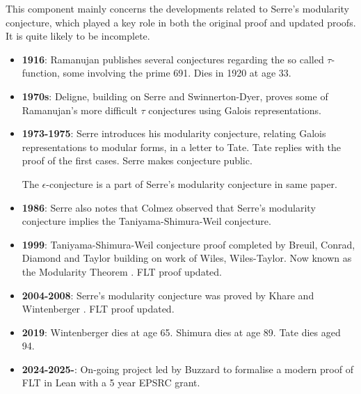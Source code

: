 \documentclass{article}
\theoremstyle{definition}
\theoremstyle{definition}
\theoremstyle{definition}
\begin{document}
This component mainly concerns the developments related to Serre's modularity conjecture, which played a key role in both the original proof and updated proofs. It is quite likely to be incomplete.
\begin{itemize}

\item \textbf{1916}: Ramanujan publishes several conjectures regarding the so called $\tau$-function, some involving the prime 691. Dies in 1920 at age 33. %

\item \textbf{1970s}: Deligne, building on Serre and Swinnerton-Dyer, proves some of Ramanujan’s more difficult $\tau$ conjectures using Galois representations.

\item \textbf{1973-1975}: Serre introduces his modularity conjecture, relating Galois representations to modular forms, in a letter to Tate. Tate replies with the proof of the first cases. Serre makes conjecture public.

 The $\epsilon$-conjecture is a part of Serre's modularity conjecture in same paper.

\item \textbf{1986}: Serre also notes that Colmez observed that Serre's modularity conjecture implies the Taniyama-Shimura-Weil conjecture.

   \item \textbf{1999}: Taniyama-Shimura-Weil conjecture proof completed by Breuil, Conrad, Diamond and Taylor building on work of Wiles, Wiles-Taylor. Now known as the Modularity Theorem \cite{BCDT}. FLT proof updated.

\item \textbf{2004-2008}: Serre's modularity conjecture was proved by Khare and Wintenberger \cite{SMC}. FLT proof updated.

\item \textbf{2019}: Wintenberger dies at age 65. Shimura dies at age 89. Tate dies aged 94.



\item \textbf{2024-2025-}: On-going project led by Buzzard to formalise a modern proof of FLT in Lean with a 5 year EPSRC grant.

\end{itemize}
\end{document}
